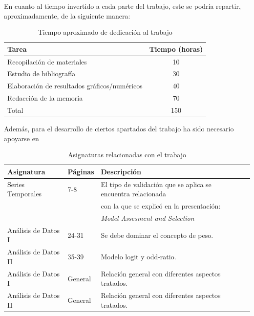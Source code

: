 \documentclass[12pt,twoside]{article}
\begin{document}
En cuanto al tiempo invertido a cada parte del trabajo, este se podría repartir, aproximadamente, de la siguiente manera:
\begin{table}[ht] 
\centering
\begin{tabular}{lc} 
  \hline
 Tarea & Tiempo (horas) \\ 
  \hline
Recopilación de materiales &   10 \\ 
Estudio de bibliografía &   30\\ 
Elaboración de resultados gráficos/numéricos &  40 \\ 
Redacción de la memoria &  70 \\
 \hline
Total & 150\\
\hline
\end{tabular}
\caption{Tiempo aproximado de dedicación al trabajo} \label{tab{02}}
\end{table}


Además, para el desarrollo de ciertos apartados del trabajo ha sido necesario apoyarse en
\begin{table}[ht] 
\centering
\begin{tabular}{llll} 
  \hline
 Asignatura & Páginas & Descripción  \\ 
  \hline
Series Temporales & 7-8 & El tipo de validación que se aplica se encuentra relacionada  \\ 
 &  &  con la que se explicó en la presentación: \\ 
 &  & \textit{Model Assesment and Selection} \\ 
Análisis de Datos I & 24-31 & Se debe dominar el concepto de peso. \\
Análisis de Datos II & 35-39 & Modelo logit y odd-ratio.\\ 
Análisis de Datos I & General & Relación general con diferentes aspectos tratados. \\
Análisis de Datos II & General & Relación general con diferentes aspectos tratados. \\
\hline
\end{tabular}
\caption{Asignaturas relacionadas con el trabajo} \label{tab{03}}
\end{table}
\end{document}
